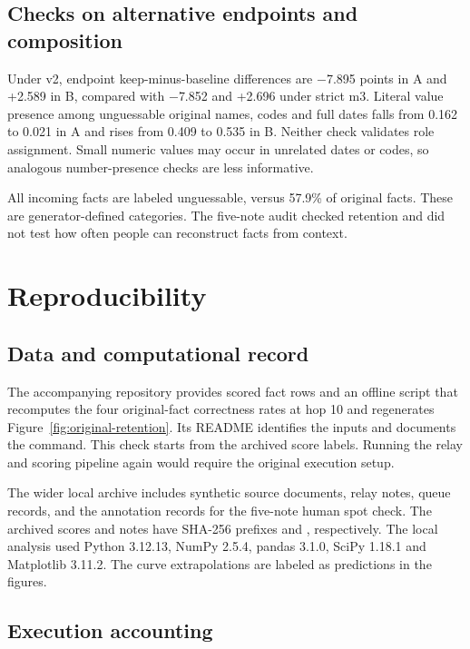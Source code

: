 \documentclass[10pt,letterpaper]{amsart}
\numberwithin{equation}{section}
\begin{document}
\subsection*{Checks on alternative endpoints and composition}

Under v2, endpoint keep-minus-baseline differences are \ensuremath{-}7.895 points in A and
+2.589 in B, compared with \ensuremath{-}7.852 and +2.696 under strict m3. Literal value
presence among unguessable original names, codes and full dates falls from 0.162 to 0.021
in A and rises from 0.409 to 0.535 in B. Neither check validates role assignment. Small
numeric values may occur in unrelated dates or codes, so analogous number-presence checks
are less informative.

All incoming facts are labeled unguessable, versus 57.9\% of original facts. These are
generator-defined categories. The five-note audit checked retention and did not test how
often people can reconstruct facts from context.

\FloatBarrier
\section*{Reproducibility}


\subsection*{Data and computational record}

The accompanying repository provides scored fact rows and an offline script that
recomputes the four original-fact correctness rates at hop 10 and regenerates
Figure~\ref{fig:original-retention}. Its README identifies the inputs and documents
the command. This check starts from the archived score labels. Running the relay and
scoring pipeline again would require the original execution setup.

The wider local archive includes synthetic source documents, relay notes, queue records,
and the annotation records for the five-note human spot check. The archived scores and
notes have SHA-256 prefixes 
and , respectively. The local analysis used Python 3.12.13,
NumPy 2.5.4, pandas 3.1.0, SciPy 1.18.1 and Matplotlib 3.11.2. The curve extrapolations
are labeled as predictions in the figures.

\subsection*{Execution accounting}
\end{document}
